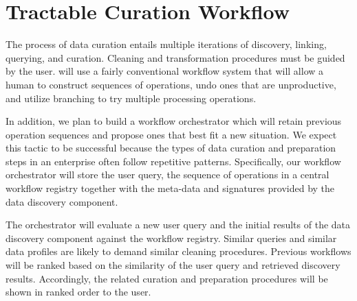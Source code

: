 \section{Tractable Curation Workflow}
\label{sec:workflow}

The process of data curation entails multiple iterations of discovery, linking, querying, and curation. Cleaning and
transformation procedures must be guided by the user. \dcv will use a fairly
conventional workflow system that will allow a human to construct sequences of
operations, undo ones that are unproductive, and utilize branching to try
multiple processing operations.


In addition, we plan to build a workflow orchestrator which will retain previous
operation sequences and propose ones that best fit a new situation. We
expect this tactic to be successful because the types of data curation and
preparation steps in an enterprise often follow repetitive patterns.
Specifically, our workflow orchestrator will store the user query, the sequence
of operations in a central workflow registry together with the meta-data and
signatures provided by the data discovery component. 


The orchestrator will evaluate a new user query and the initial results of
the data discovery component against the workflow registry. Similar queries and
similar data profiles are likely to demand similar cleaning procedures. Previous
workflows will be ranked based on the similarity of the user query and retrieved
discovery results. Accordingly, the related curation and preparation procedures
will be shown in ranked order to the user.
